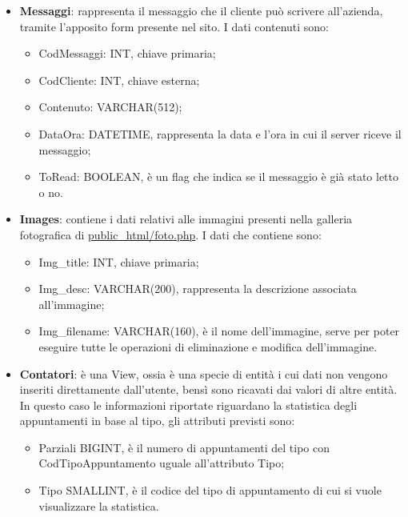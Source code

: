 {{\begin{itemize}
					\begin{itemize}\itemsep1pt
						\item CodAccount: SMALLINT, chiave primaria;
						\item username: VARCHAR(20);
						\item password: VARCHAR(32), contiene la versione cifrata della password dell'utente.
					\end{itemize}
				\item \textbf{Messaggi}: rappresenta il messaggio che il cliente può scrivere all'azienda, tramite l'apposito form presente nel sito. I dati contenuti sono:
					\begin{itemize}\itemsep1pt
						\item CodMessaggi: INT, chiave primaria;
						\item CodCliente: INT, chiave esterna;
						\item Contenuto: VARCHAR(512);
						\item DataOra: DATETIME, rappresenta la data e l'ora in cui il server riceve il messaggio;
						\item ToRead: BOOLEAN, è un flag che indica se il messaggio è già stato letto o no.
					\end{itemize}
				\item \textbf{Images}: contiene i dati relativi alle immagini presenti nella galleria fotografica di \href{http://tecnologie-web.studenti.math.unipd.it/tecweb/~pgabelli/public\_html/foto.php}{public\_html/foto.php}. I dati che contiene sono:
					\begin{itemize}\itemsep1pt
						\item Img\_title: INT, chiave primaria;
						\item Img\_desc: VARCHAR(200), rappresenta la descrizione associata all'immagine;
						\item Img\_filename: VARCHAR(160), è il nome dell'immagine, serve per poter eseguire tutte le operazioni di eliminazione e modifica dell'immagine.
					\end{itemize}
				\item \textbf{Contatori}: è una View, ossia è una specie di entità i cui dati non vengono inseriti direttamente dall'utente, bensì sono ricavati dai valori di altre entità. In questo caso le informazioni riportate riguardano la statistica degli appuntamenti in base al tipo, gli attributi previsti sono:
					\begin{itemize}
						\item Parziali BIGINT, è il numero di appuntamenti del tipo con CodTipoAppuntamento uguale all'attributo Tipo;
						\item Tipo SMALLINT, è il codice del tipo di appuntamento di cui si vuole visualizzare la statistica.
					\end{itemize}
			\end{itemize}
	}
}
